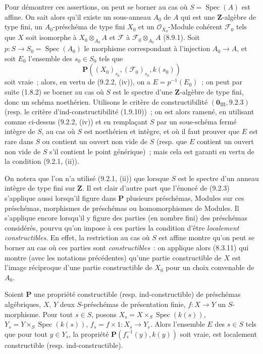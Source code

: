 Pour démontrer ces assertions, on peut se borner au cas où
$S=\operatorname{Spec}(A)$ est affine. On sait alors qu'il existe un
sous-anneau $A_0$ de $A$ qui est une $\mathbf Z$-algèbre de type fini, un
$A_0$-préschéma de type fini $X_0$ et un $\mathcal O_{X_0}$-Module cohérent
$\mathcal F_0$ tels que $X$ soit isomorphe à $X_0\otimes_{A_0}A$ et
$\mathcal F$ à $\mathcal F_0\otimes_{A_0}A$ (8.9.1). Soit
$p:S\to S_0=\operatorname{Spec}(A_0)$ le morphisme correspondant à
l'injection $A_0\to A$, et soit $E_0$ l'ensemble des $s_0\in S_0$ tels que
\[
\mathbf P((X_0)_{s_0},(\mathcal F_0)_{s_0},k(s_0))
\]
soit vraie~; alors, en vertu de (9.2.2, (iv)), on a $E=p^{-1}(E_0)$~; on peut
par suite (1.8.2) se borner au cas où $S$ est le spectre d'une
$\mathbf Z$-algèbre de type fini, donc un schéma noethérien. Utilisons le
critère de constructibilité $(\mathbf 0_{\mathrm{III}},9.2.3)$ (resp. le
critère d'ind-constructibilité (1.9.10))~; on est alors ramené, en utilisant
comme ci-dessus (9.2.2, (iv)) et en remplaçant $S$ par un sous-schéma fermé
intègre de $S$, au cas où $S$ est noethérien et intègre, et où il faut prouver
que $E$ est rare dans $S$ ou contient un ouvert non vide de $S$ (resp. que $E$
contient un ouvert non vide de $S$ s'il contient le point générique)~; mais
cela est garanti en vertu de la condition (9.2.1, (ii)).

On notera que l'on n'a utilisé (9.2.1, (ii)) que lorsque $S$ est le spectre
d'un anneau intègre de type fini sur $\mathbf Z$. Il est clair d'autre part
que l'énoncé de (9.2.3) s'applique aussi lorsqu'il figure dans $\mathbf P$
plusieurs préschémas, Modules sur ces préschémas, morphismes de préschémas ou
homomorphismes de Modules. Il s'applique encore lorsqu'il y figure des parties
(en nombre fini) des préschémas considérés, pourvu qu'on impose à ces parties
la condition d'être \emph{localement constructibles}. En effet, la restriction
au cas où $S$ est affine montre qu'on peut se borner au cas où ces parties sont
\emph{constructibles}~: on applique alors (8.3.11) qui montre (avec les
notations précédentes) qu'une partie constructible de $X$ est l'image
réciproque d'une partie constructible de $X_0$ pour un choix convenable de
$A_0$.

\begin{corollary}[9.2.4]
\label{IV.9.2.4-fr}
Soient $\mathbf P$ une propriété constructible (resp. ind-constructible) de
préschémas algébriques, $X$, $Y$ deux $S$-préschémas de présentation finie,
$f:X\to Y$ un $S$-morphisme. Pour tout $s\in S$, posons
$X_s=X\times_S\operatorname{Spec}(k(s))$,
$Y_s=Y\times_S\operatorname{Spec}(k(s))$,
$f_s=f\times1:X_s\to Y_s$. Alors l'ensemble $E$ des $s\in S$ tels que pour
tout $y\in Y_s$, la propriété $\mathbf P(f_s^{-1}(y),k(y))$ soit vraie, est
localement constructible (resp. ind-constructible).
\end{corollary}

